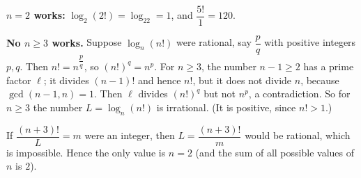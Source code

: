 \textbf{$n=2$ works:} $\log_2(2!)=\log_22=1$, and $\dfrac{5!}{1}=120$.

\textbf{No $n\ge3$ works.} Suppose $\log_n(n!)$ were rational, say $\dfrac {p}{q}$ with positive integers $p,q$. Then $n!=n^{\dfrac {p}{q}}$, so $(n!)^q=n^p$. For $n\ge3$, the number $n-1\ge2$ has a prime factor $\ell$; it divides $(n-1)!$ and hence $n!$, but it does not divide $n$, because $\gcd(n-1,n)=1$. Then $\ell$ divides $(n!)^q$ but not $n^p$, a contradiction. So for $n\ge3$ the number $L=\log_n(n!)$ is irrational. (It is positive, since $n!>1$.)

If $\dfrac{(n+3)!}{L}=m$ were an integer, then $L=\dfrac{(n+3)!}{m}$ would be rational, which is impossible. Hence the only value is $\boxed{n=2}$ (and the sum of all possible values of $n$ is $2$).
